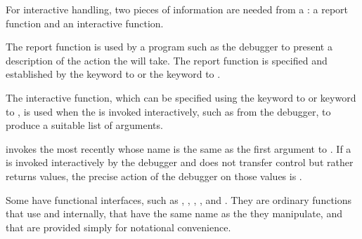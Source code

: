 For interactive handling, two pieces of information are needed
from a : a report function and an interactive function.
 
The report function
is used by a program such as the debugger to
present a description of the action the  will take.  
The report function is specified and established by the 
 keyword to
 or the 
 keyword to . 
 
The interactive function, which can be specified using the 
 keyword to 
 or  keyword
to , is used when the 
is invoked
interactively, such as from the debugger, to produce a suitable
list of arguments. 
 
 invokes the most recently 
 whose
name is the same as the first argument to .
If a  is invoked interactively by the debugger and  does
not transfer control but rather returns values, the precise
action of the debugger on those values is .

 
\endsubsubsubsection%
 
Some  have functional interfaces, 
such as , , 
, , and 
.
They are ordinary functions that use 
  and  internally,
that have the same name as the  they manipulate,
and that are provided simply for notational convenience.
 
